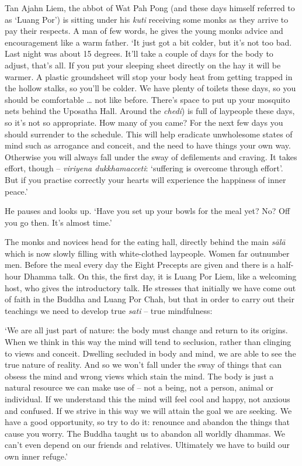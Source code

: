 Tan Ajahn Liem, the abbot of Wat Pah Pong (and these days himself
referred to as `Luang Por') is sitting under his \emph{kuti} receiving
some monks as they arrive to pay their respects. A man of few words, he
gives the young monks advice and encouragement like a warm father. `It
just got a bit colder, but it's not too bad. Last night was about 15
degrees. It'll take a couple of days for the body to adjust, that's all. 
If you put your sleeping sheet directly on the hay it will be warmer. A
plastic groundsheet will stop your body heat from getting trapped in the
hollow stalks, so you'll be colder. We have plenty of toilets these
days, so you should be comfortable \ldots{} not like before. There's
space to put up your mosquito nets behind the Uposatha Hall. Around the
\emph{chedi}) is full of laypeople these days, so it's not so
appropriate. How many of you came? For the next few days you should
surrender to the schedule. This will help eradicate unwholesome states
of mind such as arrogance and conceit, and the need to have things your
own way. Otherwise you will always fall under the sway of defilements
and craving. It takes effort, though -- \emph{viriyena dukkhamacceti}: 
`suffering is overcome through effort'. But if you practise correctly
your hearts will experience the happiness of inner peace.'

He pauses and looks up. `Have you set up your bowls for the meal yet? 
No? Off you go then. It's almost time.'

The monks and novices head for the eating hall, directly behind the main
\emph{sālā} which is now slowly filling with white-clothed laypeople. 
Women far outnumber men. Before the meal every day the Eight Precepts
are given and there is a half-hour Dhamma talk. On this, the first day, 
it is Luang Por Liem, like a welcoming host, who gives the introductory
talk. He stresses that initially we have come out of faith in the Buddha
and Luang Por Chah, but that in order to carry out their teachings we
need to develop true \emph{sati} -- true mindfulness: 

`We are all just part of nature: the body must change and return to its
origins. When we think in this way the mind will tend to seclusion, 
rather than clinging to views and conceit. Dwelling secluded in body and
mind, we are able to see the true nature of reality. And so we won't
fall under the sway of things that can obsess the mind and wrong views
which stain the mind. The body is just a natural resource we can make
use of -- not a being, not a person, animal or individual. If we
understand this the mind will feel cool and happy, not anxious and
confused. If we strive in this way we will attain the goal we are
seeking. We have a good opportunity, so try to do it: renounce and
abandon the things that cause you worry. The Buddha taught us to abandon
all worldly dhammas. We can't even depend on our friends and relatives. 
Ultimately we have to build our own inner refuge.'

